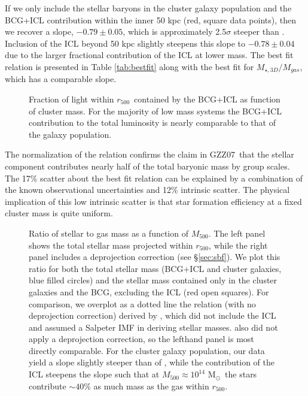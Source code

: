 \documentclass[preprint]{emulateapj}
\newcommand{\msun}{M$_\odot$}
\newcommand\rfive{$r_{500}$}
\newcommand\ptwo{GZZ07}
\newcommand\mfive{${M}_{500}$}
\begin{document}
 
If we only include the stellar baryons in the cluster galaxy
population and the BCG+ICL contribution within the inner 50 kpc (red,
square data points), then we recover a slope, $-0.79\pm0.05$, which is
approximately 2.5$\sigma$ steeper than \citet{zhang2011}. Inclusion of
the ICL beyond 50 kpc slightly steepens this slope to $-0.78\pm0.04$
due to the larger fractional contribution of the ICL at lower mass.
The best fit relation is presented in Table \ref{tab:bestfit} along
with the best fit for $M_{\star,3D}/M_{gas}$, which has a comparable
slope. 


\begin{figure}
\caption{Fraction of light within \rfive\ contained by the BCG+ICL as function of cluster mass. For the majority of low mass systems the BCG+ICL contribution to the total luminosity is nearly comparable to that of the galaxy population.  }
\label{fig:bcgiclfrac}
\end{figure}

The normalization of the relation confirms the claim in
\ptwo\ that the stellar component contributes nearly half of the
total baryonic mass by group scales.
The 17\% scatter about the best fit relation can be
explained by a combination of the known observational uncertainties and 12\%
intrinsic scatter. The physical implication of this low intrinsic scatter is that star
formation efficiency at a fixed cluster mass is quite uniform.


\begin{figure*}
\caption{Ratio of stellar to gas mass as a function of \mfive. The left panel shows the total stellar mass projected within \rfive, while the right panel includes a deprojection correction (see \S \ref{sec:sbf}). We plot this ratio for both the total stellar mass (BCG+ICL and cluster galaxies, blue filled circles) and the stellar mass contained only in the cluster galaxies and the BCG, excluding the ICL (red open squares). For comparison, we overplot as a dotted line the relation (with no deprojection correction) derived by \citet{zhang2011}, which did not include the ICL and assumed a Salpeter IMF in deriving stellar masses. \citet{zhang2011} also did not apply a deprojection correction, so the lefthand panel is most directly comparable. For the cluster galaxy population, our data yield a slope slightly steeper than of \citet{zhang2011}, while the contribution of the ICL steepens the slope such that at $M_{500}\approx10^{14}$ \msun\ the stars contribute $\sim40$\% as much mass as the gas within \rfive. 
  \label{fig:stargas}}
\end{figure*}
\end{document}
